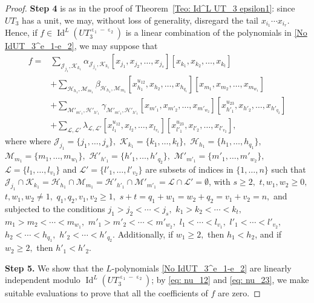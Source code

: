 \documentclass[a4paper,reqno]{amsart}
\theoremstyle{definition}
\numberwithin{equation}{section}
\numberwithin{theorem}{section}
\DeclareMathOperator{\I}{Id}
\DeclareMathOperator{\e}{\varepsilon}
\begin{document}
\begin{proof}
\textbf{Step 4} is as in the proof of Theorem~\ref{Teo: Id^L UT_3 epsilon1}: since $UT_3$ has a
unit, we may, without loss of generality, disregard the tail $x_{i_1}\cdots x_{i_r}$. Hence, if  $f\in \I^L(UT_3^{\e_1-\e_2})$ is a linear combination of the polynomials in \eqref{No IdUT_3^e_1-e_2},   we may
suppose that
\begin{align*}
    f = &\sum_{\mathcal{J}_{j_1}, \mathcal{K}_{k_1}} \alpha_{ \mathcal{J}_{j_1}, \mathcal{K}_{k_1}} [x_{j_1},x_{j_2},\dots,x_{j_s}][x_{k_1},x_{k_2},\dots,x_{k_t}]\\
    &+ \sum_{ \mathcal{H}_{h_1}, \mathcal{M}_{m_1}}  \beta_{\mathcal{H}_{h_1}, \mathcal{M}_{m_1}} [x_{h_1}^{u_{12}},x_{h_2},\dots,x_{h_{q_1}}][x_{m_1},x_{m_2},\dots,x_{m_{w_1}}]\\
    &+ \sum_{ \mathcal{M}'_{m'_1}, \mathcal{H}'_{h'_1}}  \gamma_{ \mathcal{M}'_{m'_1}, \mathcal{H}'_{h'_1}}[x_{m'_1},x_{m'_2},\dots,x_{m'_{w_2}}][x_{h'_1}^{u_{23}},x_{h'_2},\dots,x_{h'_{q_2}}]\\
    &+ \sum_{\mathcal{L}, \mathcal{L}'}  \lambda_{\mathcal{L}, \mathcal{L}'}[x_{l_1}^{u_{12}},x_{l_2},\dots,x_{l_{v_1}}][x_{l'_1}^{u_{23}},x_{l'_2},\dots,x_{l'_{v_2}}],
\end{align*}
where where $\mathcal{J}_{j_1}=\{j_1,\ldots,j_s\},$ $\mathcal{K}_{k_1}=\{k_1,\ldots,k_t\},$ $\mathcal{H}_{h_1}=\{h_1,\ldots,h_{q_1}\},$ $\mathcal{M}_{m_1}=\{m_1,\ldots,m_{w_1}\},$ $\mathcal{H}'_{h'_1}=\{h'_1,\ldots,h'_{q_2}\},$ $\mathcal{M}'_{m'_1}=\{m'_1,\ldots,m'_{w_2}\},$ $\mathcal{L}=\{l_1,\ldots,l_{v_1}\}$ and $\mathcal{L}'=\{l'_1,\ldots,l'_{v_2}\}$
 are subsets of indices in $\{1,\ldots, n\}$ such that $\mathcal{J}_{j_1}\cap \mathcal{K}_{k_1}=\mathcal{H}_{h_1}\cap \mathcal{M}_{m_1}=\mathcal{H}'_{h'_1}\cap \mathcal{M}'_{m'_1}=\mathcal{L}\cap \mathcal{L}'=\emptyset$, with
$s\geq 2,$ $t, w_1,w_2\geq 0,$ $t,w_1,w_2\neq 1,$ $q_1,q_2,v_1,v_2\geq 1,$ $s+t=q_1+w_1=w_2+q_2=v_1+v_2=n,$ and subjected  to the conditions $j_1>j_2<  \cdots < j_s,$ $k_1>k_2<  \cdots < k_t,$ $m_1> m_2< \cdots < m_{w_1},$ $m'_1> m'_2< \cdots < m'_{w_2},$
$l_1< \cdots < l_{v_1},$ $l'_1< \cdots < l'_{v_2},$ $h_2< \cdots <h_{q_1},$ $h'_2< \cdots <h'_{q_2}.$ Additionally, if $w_1\geq 2,$ then $h_1< h_2$, and  if $w_2\geq 2,$ then $h'_1< h'_2.$



\textbf{Step 5.} We show that the $L$-polynomials \eqref{No IdUT_3^e_1-e_2} are linearly independent modulo
$\I^L(UT_3^{\e_1-\e_2})$; by \eqref{eq: nu_12} and \eqref{eq: nu_23}, we make suitable evaluations
to prove that all the coefficients of $f$ are zero.


\end{proof}
\end{document}
